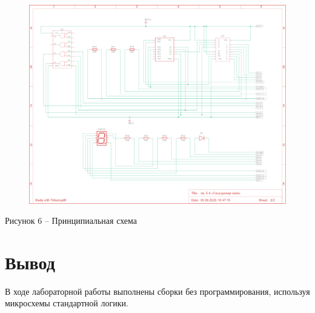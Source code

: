 \documentclass[a4paper,14pt]{extarticle}
\begin{document}
  \begin{figure}[h]
    \centering
    \includegraphics[width=0.72\linewidth]{images/image-6}
  \end{figure}
  \begin{center}
    Рисунок 6 – Принципиальная схема
  \end{center}

  \section*{\hspace{12.5mm}Вывод}
  В ходе лабораторной работы выполнены сборки без программирования, используя микросхемы стандартной логики.
 
\end{document}

